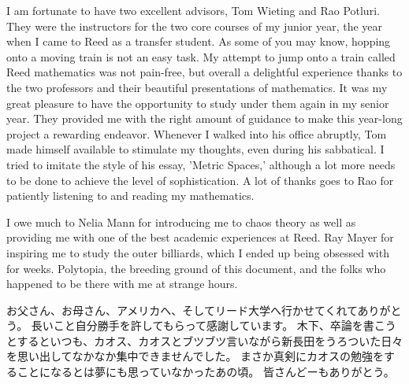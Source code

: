 I am fortunate to have two excellent advisors, Tom Wieting and Rao Potluri.
They were the instructors for the two core courses of my junior year, the year when I came to Reed as a transfer student.
As some of you may know, hopping onto a moving train is not an easy task.
My attempt to jump onto a train called Reed mathematics was not pain-free, but overall a delightful experience thanks to the two professors and their beautiful presentations of mathematics.
It was my great pleasure to have the opportunity to study under them again in my senior year.
They provided me with the right amount of guidance to make this year-long project a rewarding endeavor.
Whenever I walked into his office abruptly, Tom made himself available to stimulate my thoughts, even during his sabbatical.
I tried to imitate the style of his essay, 'Metric Spaces,' although a lot more needs to be done to achieve the level of sophistication.
A lot of thanks goes to Rao for patiently listening to and reading my mathematics.

I owe much to Nelia Mann for introducing me to chaos theory as well as providing me with one of the best academic experiences at Reed.
Ray Mayer for inspiring me to study the outer billiards, which I ended up being obsessed with for weeks.
Polytopia, the breeding ground of this document, and the folks who happened to be there with me at strange hours.

\vspace{1cm}
{\small
お父さん、お母さん、アメリカへ、そしてリード大学へ行かせてくれてありがとう。
長いこと自分勝手を許してもらって感謝しています。
木下、卒論を書こうとするといつも、カオス、カオスとブツブツ言いながら新長田をうろついた日々を思い出してなかなか集中できませんでした。
まさか真剣にカオスの勉強をすることになるとは夢にも思っていなかったあの頃。
皆さんどーもありがとう。
}
